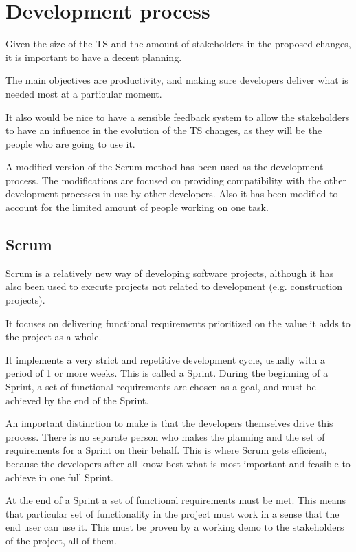 \chapter{Development process}
Given the size of the TS and the amount of stakeholders in the proposed changes,
it is important to have a decent planning.

The main objectives are productivity, and making sure developers deliver what is needed most
at a particular moment.

It also would be nice to have a sensible feedback system to allow the stakeholders
to have an influence in the evolution of the TS changes, as they will be the
people who are going to use it.

A modified version of the Scrum method has been used as the development process.
The modifications are focused on providing compatibility with the other development
processes in use by other developers.
Also it has been modified to account for the limited amount of people working on
one task.

\section{Scrum}
Scrum is a relatively new way of developing software projects, although it has
also been used to execute projects not related to development (e.g. construction
projects).

It focuses on delivering functional requirements prioritized on the value it adds
to the project as a whole.

It implements a very strict and repetitive development cycle, usually with a
period of 1 or more weeks. This is called a Sprint. During the beginning of a
Sprint, a set of functional requirements are chosen as a goal, and must be
achieved by the end of the Sprint.

An important distinction to make is that the developers themselves drive this
process. There is no separate person who makes the planning and the set of
requirements for a Sprint on their behalf.
This is where Scrum gets efficient, because the developers after all know best
what is most important and feasible to achieve in one full Sprint.

At the end of a Sprint a set of functional requirements must be met. This means
that particular set of functionality in the project must work in a sense that
the end user can use it. This must be proven by a working demo to the
stakeholders of the project, all of them.

